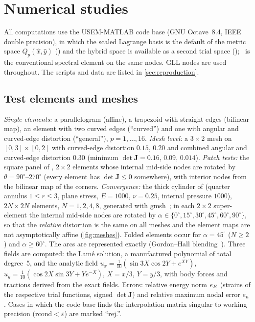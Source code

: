 \section{Numerical studies}\label{sec:numerics}
All computations use the USEM-MATLAB code base (GNU Octave~8.4, IEEE double precision), in
which the scaled Lagrange basis is the default of the metric space $Q_p(\hat x,\hat y)$
(\PM) and the hybrid space is available as a second trial space (\PH); \PP\ is the
conventional spectral element on the same nodes. GLL nodes are used throughout. The scripts
and data are listed in \cref{sec:reproduction}.

\subsection{Test elements and meshes}\label{sec:elements}
\emph{Single elements:} a parallelogram (affine), a trapezoid with straight edges (bilinear
map), an element with two curved edges (``curved'') and one with angular and curved-edge
distortion (``general''), $p=1,\dots,16$. \emph{Mesh level:} a $3\times2$ mesh on
$[0,3]\times[0,2]$ with curved-edge distortion $0.15$, $0.20$ and combined angular and
curved-edge distortion $0.30$ (minimum $\det\bm J=0.16$, $0.09$, $0.014$). \emph{Patch tests:}
the square panel of \citet[Secs.~5.5--5.7]{Rajendran2010technique}, $2\times2$ elements whose
internal mid-side nodes are rotated by $\theta=90^\circ$--$270^\circ$ (every element has
$\det\bm J\le0$ somewhere), with interior nodes from the bilinear map of the corners.
\emph{Convergence:} the thick cylinder of \citet[Sec.~5.9]{Rajendran2010technique} (quarter
annulus $1\le r\le3$, plane stress, $E=1000$, $\nu=0.25$, internal pressure $1000$),
$2N\times2N$ elements, $N=1,2,4,8$, generated with gmsh~\cite{Geuzaine2009Gmsh}; in each
$2\times2$ super-element the internal mid-side nodes are rotated by
$\alpha\in\{0^\circ,15^\circ,30^\circ,45^\circ,60^\circ,90^\circ\}$, so that the
\emph{relative} distortion is the same on all meshes and the element maps are not asymptotically
affine (\cref{fig:meshes}). Folded elements occur for $\alpha=45^\circ$ ($N\ge2$) and
$\alpha\ge60^\circ$. The arcs are represented exactly (Gordon--Hall blending~\cite{Gordon1973Transfinite}).
Three fields are computed: the Lam\'e solution, a manufactured polynomial of total degree~5, and
the analytic field $u_x=\tfrac1{10}(\sin3X\cos2Y+e^{XY})$, $u_y=\tfrac1{10}(\cos2X\sin3Y+Ye^{-X})$,
$X=x/3$, $Y=y/3$, with body forces and tractions derived from the exact fields.
Errors: relative energy norm $e_{E}$ (strains of the respective trial functions, signed
$\det\bm J$) and relative maximum nodal error $e_n$. Cases in which the code base finds the
interpolation matrix singular to working precision ($\mathrm{rcond}<\varepsilon$) are marked
``rej.''.

